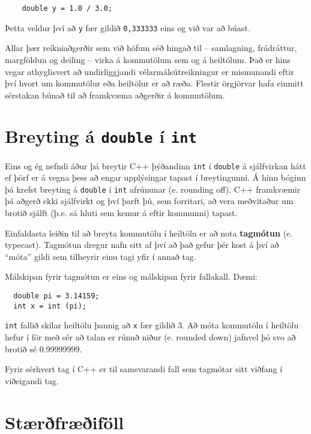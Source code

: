 \begin{verbatim}
    double y = 1.0 / 3.0;
\end{verbatim}
%
Þetta veldur því að {\tt y} fær gildið {\tt 0,333333} eins og við var að búast.


Allar þær reikniaðgerðir sem við höfum séð hingað til -- samlagning, frádráttur, margföldun og deiling -- virka á kommutölum sem og á heiltölum.
Það er hins vegar athyglisvert að undirliggjandi vélarmálsútreikningur er mismunandi eftir því hvort um kommutölur eða heiltölur er að ræða.
Flestir örgjörvar hafa einmitt sérstakan búnað til að framkvæma aðgerðir á kommutölum.

\section{Breyting á {\tt double} í {\tt int}}
\label{rounding}

Eins og ég nefndi áður þá breytir C++ þýðandinn {\tt int}
í {\tt double} á sjálfvirkan hátt ef þörf er á vegna þess að engar upplýsingar tapast í breytingunni.
Á hinn bóginn þá krefst breyting á {\tt double} í {\tt int} afrúnunar (e. rounding off).
C++ framkvæmir þá aðgerð ekki sjálfvirkt og því þarft þú, sem forritari, að vera meðvitaður um brotið sjálft (þ.e. sá hluti sem kemur á eftir kommunni) tapast.

Einfaldasta leiðin til að breyta kommutölu í heiltölu er að nota {\bf tagmótun} (e. typecast).
Tagmótun dregur nafn sitt af því að það gefur þér kost á því að ``móta'' gildi sem tilheyrir einu tagi yfir í annað tag.

Málskipan fyrir tagmótun er eins og málskipan fyrir fallakall.
Dæmi:

\begin{verbatim}
  double pi = 3.14159;
  int x = int (pi);
\end{verbatim}
%
{\tt int} fallið skilar heiltölu þannig að {\tt x} fær gildið 3.
Að móta kommutölu í heiltölu hefur í för með sér að talan er rúnuð niður (e. rounded down) jafnvel þó svo að brotið sé 0.99999999.

Fyrir sérhvert tag í C++ er til samsvarandi fall sem tagmótar sitt viðfang í viðeigandi tag.

\section{Stærðfræðiföll}

